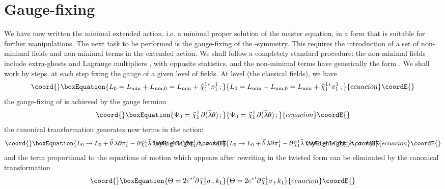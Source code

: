 \documentclass[a4paper,12pt]{article}
\begin{document}
\section{Gauge-fixing}
\label{sec:gauge}

We have now written the minimal extended action, i.e. a minimal proper
solution of the master equation, in a form that is suitable for
further manipulations.  The next task to be performed is the
gauge-fixing of the \myHighlight{$\kappa$}\coordHE{}-symmetry. This requires the introduction
of a set of non-minimal fields and non-minimal terms in the extended
action. We shall follow a completely standard procedure: the
non-minimal fields include extra-ghosts \myHighlight{$\chi$}\coordHE{} and Lagrange
multipliers \myHighlight{$\pi$}\coordHE{}, with opposite statistics, and the non-minimal terms
have generically the form \myHighlight{$\bar\chi^* \pi$}\coordHE{}.  We shall work by steps,
at each step fixing the gauge of a given level of fields.  At level
\coordHE{} (the classical fields), we have
\begin{equation}\coord{}\boxEquation{
  L_0 = L_{\rm min} + L_{\rm nm,0} = L_{\rm min} + {\bar\chi}_1^{1*} \pi_1^1 \, ;
}{
  L_0 = L_{\rm min} + L_{\rm nm,0} = L_{\rm min} + {\bar\chi}_1^{1*} \pi_1^1 \, ;
}{ecuacion}\coordE{}\end{equation}
the gauge-fixing of \myHighlight{$\theta$}\coordHE{} is achieved by the gauge fermion
\begin{equation}\coord{}\boxEquation{
  \Psi_0 = \bar\chi_1^1 \, \partial(\bar\lambda \theta) \,;
}{
  \Psi_0 = \bar\chi_1^1 \, \partial(\bar\lambda \theta) \,;
}{ecuacion}\coordE{}\end{equation}
the canonical transformation generates new terms in the action:
\begin{equation}\coord{}\boxEquation{
  L_0 \to L_0 + \bar\theta \, \lambda \partial\pi_1^1 -
  \partial\bar\chi_1^1 \bar\lambda \, \SL{P} \lambda
  k_1 - 2 e^* \partial \bar\chi_1^1 \, \sigma_+ \sigma_- k_2 ; 
}{
  L_0 \to L_0 + \bar\theta \, \lambda \partial\pi_1^1 -
  \partial\bar\chi_1^1 \bar\lambda \, \SL{P} \lambda
  k_1 - 2 e^* \partial \bar\chi_1^1 \, \sigma_+ \sigma_- k_2 ; 
}{ecuacion}\coordE{}\end{equation}
and the term proportional to the equations of motion which appears
after rewriting \coordHE{} in the twisted form can be eliminated by the
canonical transformation
\begin{equation}\coord{}\boxEquation{
  \Theta = 2 {e^*}' \partial \bar\chi_1^1 \sigma_+ k_1
}{
  \Theta = 2 {e^*}' \partial \bar\chi_1^1 \sigma_+ k_1
}{ecuacion}\coordE{}\end{equation}
\end{document}
